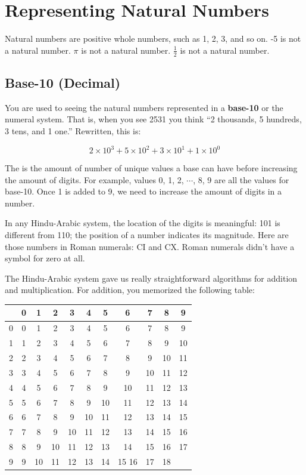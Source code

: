 \chapter{Representing Natural Numbers}\label{chap:hexbinary}

Natural numbers are positive whole numbers, such as 1, 2, 3, and so on. -5 is not a natural
number. $\pi$ is not a natural number. $\frac{1}{2}$ is not a natural
number.

\section{Base-10 (Decimal)}
You are used to seeing the natural numbers represented in a \textbf{base-10}
 or the  numeral system. That is, when you see 2531 you
think ``2 thousands, 5 hundreds, 3 tens, and 1 one.'' Rewritten, this is:

$$2 \times 10^3 + 5 \times 10^2 + 3 \times 10^1 + 1 \times 10^0$$

The  is the amount of number of unique values a base can have before increasing the amount of digits. 
For example, values 0, 1, 2, $\cdots$, 8, 9 are all the values for base-10. 
Once 1 is added to 9, we need to increase the amount of digits in a number. 

In any Hindu-Arabic system, the location of the digits is meaningful:
101 is different from 110; the position of a number indicates its magnitude. Here are those numbers in Roman numerals:
CI and CX. Roman numerals didn't have a symbol for zero at all.

The Hindu-Arabic system gave us really straightforward algorithms for
addition and multiplication. For addition, you memorized the following table:

\begin{tabular}{ c || c | c | c | c | c | c| c| c| c| c }
 & 0 & 1 & 2 & 3 & 4 & 5 & 6 & 7 & 8 & 9 \\
 \hline
0 & 0 & 1 & 2 & 3 & 4 & 5 & 6 & 7 & 8 & 9 \\
1 & 1 & 2 & 3 & 4 & 5 & 6 & 7 & 8 & 9 & 10 \\
2 & 2 & 3 & 4 & 5 & 6 & 7 & 8 & 9 & 10 & 11\\
3 & 3 & 4 & 5 & 6 & 7 & 8 & 9 & 10 & 11 & 12\\
4 & 4 & 5 & 6 & 7 & 8 & 9 & 10 & 11 & 12 & 13\\
5 & 5 & 6 & 7 & 8 & 9 & 10 & 11 & 12 & 13 & 14\\
6 & 6 & 7 & 8 & 9 & 10 & 11 & 12 & 13 & 14 & 15\\
7 & 7 & 8 & 9 & 10 & 11 & 12 & 13 & 14 & 15 & 16\\
8 & 8 & 9 & 10 & 11 & 12 & 13 & 14 & 15 & 16 & 17\\
9 & 9 & 10 & 11 & 12 & 13 & 14 & 15 16 & 17 & 18\\
\end{tabular}

